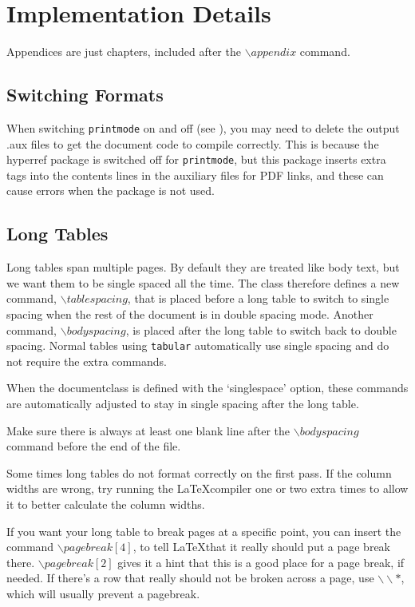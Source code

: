 \chapter{Implementation Details\label{ch:implementation}}

Appendices are just chapters, included after the $\backslash appendix$ command.

\section{Switching Formats}
When switching \texttt{printmode} on and off (see ), you may need to delete the output .aux files to get the document code to compile correctly. This is because the hyperref package is switched off for \texttt{printmode}, but this package inserts extra tags into the contents lines in the auxiliary files for PDF links, and these can cause errors when the package is not used.

\section{Long Tables}

Long tables span multiple pages. By default they are treated like body text, but we want them to be single spaced all the time. The class therefore defines a new command, $\backslash tablespacing$, that is placed before a long table to switch to single spacing when the rest of the document is in double spacing mode. Another command, $\backslash bodyspacing$, is placed after the long table to switch back to double spacing. Normal tables using \texttt{tabular} automatically use single spacing and do not require the extra commands.

When the documentclass is defined with the `singlespace' option, these commands are automatically adjusted to stay in single spacing after the long table.

Make sure there is always at least one blank line after the $\backslash bodyspacing$ command before the end of the file.

Some times long tables do not format correctly on the first pass. If the column widths are wrong, try running the \LaTeX compiler one or two extra times to allow it to better calculate the column widths.

If you want your long table to break pages at a specific point, you can insert the command $\backslash pagebreak[4]$, to tell \LaTeX that it really should put a page break there. $\backslash pagebreak[2]$ gives it a hint that this is a good place for a page break, if needed. If there's a row that really should not be broken across a page, use $\backslash \backslash *$, which will usually prevent a pagebreak.

